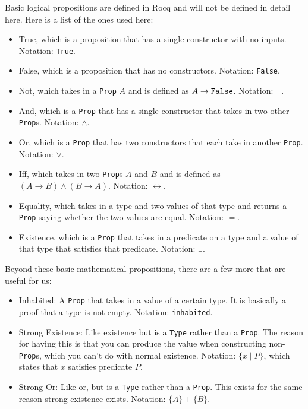 \documentclass[../../math.tex]{subfiles}
\begin{document}
Basic logical propositions are defined in Rocq and will not be defined in detail
here.  Here is a list of the ones used here:
\begin{itemize}
    \item True, which is a proposition that has a single constructor with no
    inputs.  Notation: \verb|True|.
    \item False, which is a proposition that has no constructors.  Notation:
    \verb|False|.
    \item Not, which takes in a \verb|Prop| $A$ and is defined as $A \rightarrow
    \verb|False|$.  Notation: $\neg$.
    \item And, which is a \verb|Prop| that has a single constructor that takes
    in two other \verb|Prop|s.  Notation: $\wedge$.
    \item Or, which is a \verb|Prop| that has two constructors that each take
    in another \verb|Prop|.  Notation: $\vee$.
    \item Iff, which takes in two \verb|Prop|s $A$ and $B$ and is defined as $(A
    \rightarrow B) \wedge (B \rightarrow A)$.  Notation: $\leftrightarrow$.
    \item Equality, which takes in a type and two values of that type and
    returns a \verb|Prop| saying whether the two values are equal.  Notation:
    $=$.
    \item Existence, which is a \verb|Prop| that takes in a predicate on a type
    and a value of that type that satisfies that predicate.  Notation:
    $\exists$.
\end{itemize}

Beyond these basic mathematical propositions, there are a few more that are
useful for us:

\begin{itemize}
    \item Inhabited: A \verb|Prop| that takes in a value of a certain type.  It
    is basically a proof that a type is not empty.  Notation: \verb|inhabited|.
    \item Strong Existence: Like existence but is a \verb|Type| rather than a
    \verb|Prop|.  The reason for having this is that you can produce the value
    when constructing non-\verb|Prop|s, which you can't do with normal
    existence.  Notation: $\{x \mid P\}$, which states that $x$ satisfies
    predicate $P$.
    \item Strong Or: Like or, but is a \verb|Type| rather than a \verb|Prop|.
    This exists for the same reason strong existence exists.  Notation: $\{A\} +
    \{B\}$.
\end{itemize}
\end{document}
